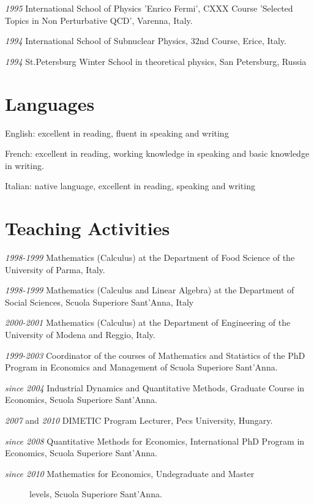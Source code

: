 \documentclass[a4paper]{article}
\begin{document}
\emph{1995} International School of Physics 'Enrico Fermi', CXXX Course
'Selected Topics in Non Perturbative QCD', Varenna, Italy.

\emph{1994} International School of Subnuclear Physics, 32nd Course, Erice,
Italy.

\emph{1994} St.Petersburg Winter School in theoretical physics, San
Petersburg, Russia


\section{Languages%
  \label{languages}%
}

English: excellent in reading, fluent in speaking and writing

French: excellent in reading, working knowledge in speaking and basic
knowledge in writing.

Italian: native language, excellent in reading, speaking and writing


\section{Teaching Activities%
  \label{teaching-activities}%
}

\emph{1998-1999} Mathematics (Calculus) at the Department of Food Science
of the University of Parma, Italy.

\emph{1998-1999} Mathematics (Calculus and Linear Algebra) at the
Department of Social Sciences, Scuola Superiore Sant'Anna, Italy

\emph{2000-2001} Mathematics (Calculus) at the Department of Engineering of
the University of Modena and Reggio, Italy.

\emph{1999-2003} Coordinator of the courses of Mathematics and
Statistics of the PhD Program in Economics and Management of Scuola
Superiore Sant'Anna.

\emph{since 2004} Industrial Dynamics and Quantitative Methods, Graduate
Course in Economics, Scuola Superiore Sant'Anna.

\emph{2007} and \emph{2010} DIMETIC Program Lecturer, Pecs University, Hungary.

\emph{since 2008} Quantitative Methods for Economics, International PhD
Program in Economics, Scuola Superiore Sant'Anna.

\begin{description}
\item[{\emph{since 2010} Mathematics for Economics, Undegraduate and Master}] 
levels, Scuola Superiore Sant'Anna.

\end{description}
\end{document}
